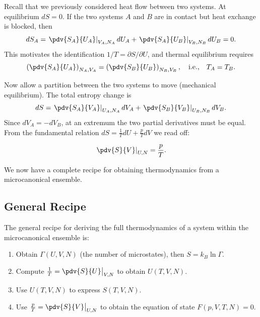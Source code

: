 Recall that we previously considered heat flow between two systems. At equilibrium $dS = 0$. If the two systems $A$ and $B$ are in contact but heat exchange is blocked, then
\begin{equation}
    dS_A = \left.\pdv{S_A}{U_A}\right|_{V_A, N_A} dU_A + \left.\pdv{S_A}{U_B}\right|_{V_B, N_B} dU_B = 0.
\end{equation}
This motivates the identification $1/T = \partial S/\partial U$, and thermal equilibrium requires
\begin{equation}
    \left(\pdv{S_A}{U_A}\right)_{N_A, V_A} = \left(\pdv{S_B}{U_B}\right)_{N_B, V_B},
    \quad \text{i.e.,}\quad T_A = T_B.
\end{equation}

Now allow a partition between the two systems to move (mechanical equilibrium). The total entropy change is
\begin{equation}
    dS = \left.\pdv{S_A}{V_A}\right|_{U_A, N_A} dV_A + \left.\pdv{S_B}{V_B}\right|_{U_B, N_B} dV_B.
\end{equation}
Since $dV_A = -dV_B$, at an extremum the two partial derivatives must be equal. From the fundamental relation $dS = \frac{1}{T}dU + \frac{p}{T}dV$ we read off:

\begin{definition}
\begin{equation}
    \left.\pdv{S}{V}\right|_{U, N} = \frac{p}{T}.
\end{equation}
\end{definition}

We now have a complete recipe for obtaining thermodynamics from a microcanonical ensemble.

\subsection{General Recipe}

The general recipe for deriving the full thermodynamics of a system within the microcanonical ensemble is:
\begin{enumerate}
    \item Obtain $\Gamma(U, V, N)$ (the number of microstates), then $S = k_B \ln \Gamma$.
    \item Compute $\frac{1}{T} = \pdv{S}{U}\big|_{V,N}$ to obtain $U(T, V, N)$.
    \item Use $U(T, V, N)$ to express $S(T, V, N)$.
    \item Use $\frac{p}{T} = \pdv{S}{V}\big|_{U,N}$ to obtain the equation of state $F(p, V, T, N) = 0$.
\end{enumerate}

